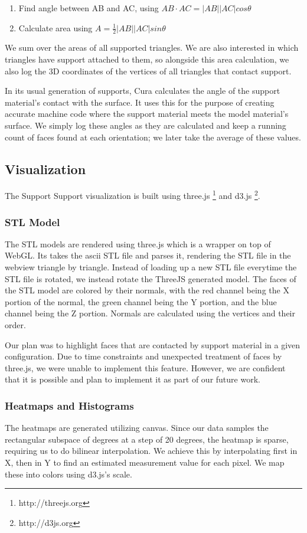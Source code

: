 \documentclass{sigchi}
\begin{document}
\begin{enumerate}
\item Find angle between AB and AC, using $AB \cdot AC = |AB||AC|cos\theta$
\item Calculate area using $A = \frac{1}{2}|AB||AC|sin\theta$
\end{enumerate}

We sum over the areas of all supported triangles.  We are also interested in which triangles have support attached to them, so alongside this area calculation, we also log the 3D coordinates of the vertices of all triangles that contact support.

In its usual generation of supports, Cura calculates the angle of the support material's contact with the surface.  It uses this for the purpose of creating accurate machine code where the support material meets the model material's surface.  We simply log these angles as they are calculated and keep a running count of faces found at each orientation; we later take the average of these values.

\subsection{Visualization}
The Support Support visualization is built using three.js \footnote{http://threejs.org} and d3.js \footnote{http://d3js.org}.

\subsubsection{STL Model}
The STL models are rendered using three.js which is a wrapper on top of WebGL. Its takes the ascii STL file and parses it, rendering the STL file in the webview triangle by triangle. Instead of loading up a new STL file everytime the STL file is rotated, we instead rotate the ThreeJS generated model.  The faces of the STL model are colored by their normals, with the red channel being the X portion of the normal, the green channel being the Y portion, and the blue channel being the Z portion.  Normals are calculated using the vertices and their order.

Our plan was to highlight faces that are contacted by support material in a given configuration.  Due to time constraints and unexpected treatment of faces by three.js, we were unable to implement this feature.  However, we are confident that it is possible and plan to implement it as part of our future work.

\subsubsection{Heatmaps and Histograms}
The heatmaps are generated utilizing canvas. Since our data samples the rectangular subspace of degrees at a step of 20 degrees, the heatmap is sparse, requiring us to do bilinear interpolation. We achieve this by interpolating first in X, then in Y to find an estimated measurement value for each pixel.  We map these into colors using d3.js's scale.
\end{document}
